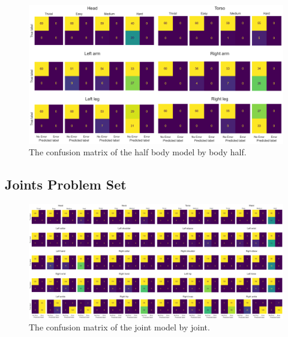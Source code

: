 \begin{figure}[ht]
  \centering
  \includegraphics[width=\textwidth]{figures/Results/v2_bs_40_is_64_e_100/confusion/body_parts.png}
  \caption[Half Body Model Confusion Matrix by Body Half]{The confusion matrix of the half body model by body half.}
  \label{fig:conf_v2_bp}
\end{figure}

\subsection{Joints Problem Set}



\begin{figure}[ht]
  \centering
  \includegraphics[width=\textwidth]{figures/Results/v2_bs_40_is_64_e_100/confusion/joints.png}
  \caption[Joint Model Confusion Matrix by Joint]{The confusion matrix of the joint model by joint.}
  \label{fig:conf_v2_bp}
\end{figure}